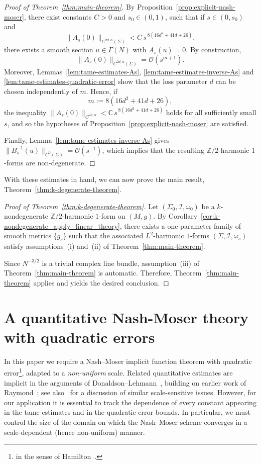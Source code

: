 \documentclass[11pt]{amsart}
\newcommand{\C}{\mathbb{C}}
\newcommand{\ZT}{\mathbb{Z}/2}
\renewcommand{\O}{\mathcal{O}}
\newcommand{\MI}{\mathcal{I}}
\begin{document}
\begin{proof}[Proof of Theorem~\ref{thm:main-theorem}]
	By Proposition~\ref{prop:explicit-nash-moser}, there exist constants \(C>0\) and
	\(s_0\in(0,1)\), such that if \(s\in(0,s_0)\) and
	\[
	\|A_{s}(0)\|_{C^{2d,\alpha}(\Sigma)}< C\, s^{\,8(16d^2+41d+26)},
	\]
	there exists a smooth section \(u\in\Gamma(N)\) with \(A_{s}(u)=0\).
	By construction,
	\[
	\|A_{s}(0)\|_{C^{2d,\alpha}(\Sigma)}=\O(s^{m+1}).
	\]
	Moreover, Lemmas~\ref{lem:tame-estimates-As}, \ref{lem:tame-estimates-inverse-As} and
	\ref{lem:tame-estimates-quadratic-error} show that the loss parameter \(d\) can be chosen
	independently of \(m\). Hence, if
	\[
	m := 8(16d^2+41d+26),
	\]
	the inequality \(\|A_{s}(0)\|_{C^{2d,\alpha}}<\C\, s^{\,8(16d^2+41d+26)}\) holds for all sufficiently small \(s\), and so the hypotheses of Proposition~\ref{prop:explicit-nash-moser} are satisfied.
	
	Finally, Lemma~\ref{lem:tame-estimates-inverse-As} gives
	\(\|B^{-1}_{s}(u)\|_{C^0(\Sigma)}=\O(s^{-1})\), which implies that the resulting
	\(\ZT\)-harmonic \(1\)-forms are non-degenerate.
\end{proof}
With these estimates in hand, we can now prove the main result,
Theorem~\ref{thm:k-degenerate-theorem}.

\begin{proof}[Proof of Theorem~\ref{thm:k-degenerate-theorem}]
	Let \((\Sigma_0,\MI,\omega_0)\) be a \(k\)-nondegenerate \(\ZT\)-harmonic \(1\)-form on
	\((M,g)\). By Corollary~\ref{cor:k-nondegenerate_apply_linear_theory}, there exists a
	one-parameter family of smooth metrics \(\{g_s\}\) such that the associated
	\(L^2\)-harmonic \(1\)-forms \((\Sigma,\MI,\omega_s)\) satisfy assumptions~(i) and~(ii) of
	Theorem~\ref{thm:main-theorem}.  
	
	Since \(N^{-3/2}\) is a trivial complex line bundle, assumption~(iii) of
	Theorem~\ref{thm:main-theorem} is automatic. Therefore, Theorem~\ref{thm:main-theorem}
	applies and yields the desired conclusion.
\end{proof}


\appendix


\section{A quantitative Nash-Moser theory with quadratic errors}
\label{sec:appendix}
In this paper we require a Nash--Moser implicit function theorem with quadratic
error\footnote{in the sense of Hamilton~\cite{Hamilton1982}.}, adapted to a \emph{non-uniform} scale. Related quantitative estimates are implicit in the arguments of
Donaldson--Lehmann~\cite{DonaldsonLehmann2024}, building on earlier work of
Raymond~\cite{Raymond1989}; see also~\cite{baldi2017nash} for a discussion of similar
scale-sensitive issues. However, for our application it is essential to track the dependence
of every constant appearing in the tame estimates and in the quadratic error bounds. In
particular, we must control the size of the domain on which the Nash--Moser scheme converges
in a scale-dependent (hence non-uniform) manner.
\end{document}
